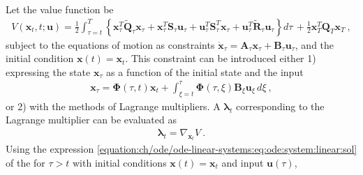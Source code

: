\documentclass[letterpaper,10pt,english]{jupyterBook}
\begin{document}
\sphinxAtStartPar
Let the value function be
\begin{equation*}
\begin{split}V(\mathbf{x}_t,t; \mathbf{u}) = \frac{1}{2} \int_{\tau=t}^{T} \left\{ \mathbf{x}^T_\tau \widetilde{\mathbf{Q}}_\tau \mathbf{x}_\tau + \mathbf{x}^T_\tau \mathbf{S}_\tau \mathbf{u}_\tau + \mathbf{u}^T_\tau \mathbf{S}^T_\tau \mathbf{x}_\tau + \mathbf{u}_\tau^T \widetilde{\mathbf{R}}_\tau \mathbf{u}_\tau \right\}  d \tau \, + \frac{1}{2} \mathbf{x}_T^T \mathbf{Q}_T \mathbf{x}_T \ ,\end{split}
\end{equation*}
\sphinxAtStartPar
subject to the equations of motion as constraints \(\dot{\mathbf{x}}_\tau = \mathbf{A}_\tau \mathbf{x}_\tau + \mathbf{B}_\tau \mathbf{u}_\tau\), and the initial condition \(\mathbf{x}(t) = \mathbf{x}_t\). This constraint can be introduced either 1) expressing the state \(\mathbf{x}_\tau\) as a function of the initial state and the input
\begin{equation*}
\begin{split}\mathbf{x}_\tau = \boldsymbol\Phi(\tau,t) \mathbf{x}_t + \int_{\xi=t}^{\tau} \boldsymbol\Phi(\tau,\xi) \mathbf{B}_\xi \mathbf{u}_\xi \, d \xi \ ,\end{split}
\end{equation*}
\sphinxAtStartPar
or 2) with the methods of Lagrange multipliers. A  \(\boldsymbol\lambda_t\) \sphinxhyphen{} corresponding to the Lagrange multiplier \sphinxhyphen{} can be evaluated as
\begin{equation*}
\begin{split}\boldsymbol\lambda_t = \nabla_{\mathbf{x}_t} V \ .\end{split}
\end{equation*}
\sphinxAtStartPar
{} Using the expression \eqref{equation:ch/ode/ode-linear-systems:eq:ode:system:linear:sol} of the {\hyperref[\detokenize{ch/ode/ode-linear-systems:ode-linear-miscellanea-general-solution}]{}} for \(\tau > t\) with initial conditions \(\mathbf{x}(t) = \mathbf{x}_t\) and input \(\mathbf{u}(\tau)\),
\end{document}
